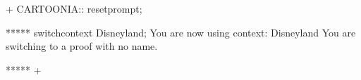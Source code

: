 


\gfexample+
   CARTOONIA:: resetprompt;

   ***** switchcontext Disneyland;
   You are now using context: Disneyland
   You are switching to a proof with no name.

   *****
+

